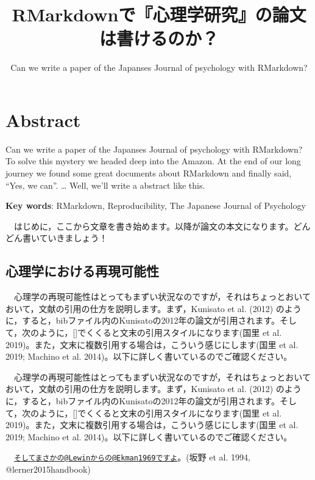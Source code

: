 \documentclass[11pt,a4paper,xelatex,ja=standard]{bxjsarticle}
\title{RMarkdownで『心理学研究』の論文は書けるのか？}
\subtitle{Can we write a paper of the Japanses Journal of psychology
with RMarkdown?}
\author{}
\date{}
\begin{document}
\pagestyle{empty}
\maketitle
\pagestyle{plain}
\setcounter{page}{1}

\hypertarget{abstract}{%
\section{Abstract}\label{abstract}}

Can we write a paper of the Japanses Journal of psychology with
RMarkdown? To solve this mystery we headed deep into the Amazon. At the
end of our long journey we found some great documents about RMarkdown
and finally said, ``Yes, we can''. \ldots{} Well, we'll write a abstract
like this.

\textbf{Key words}: RMarkdown, Reproducibility, The Japanese Journal of
Psychology

\clearpage

　はじめに，ここから文章を書き始めます。以降が論文の本文になります。どんどん書いていきましょう！

\hypertarget{ux5fc3ux7406ux5b66ux306bux304aux3051ux308bux518dux73feux53efux80fdux6027}{%
\subsection{心理学における再現可能性}\label{ux5fc3ux7406ux5b66ux306bux304aux3051ux308bux518dux73feux53efux80fdux6027}}

　心理学の再現可能性はとってもまずい状況なのですが，それはちょっとおいておいて，文献の引用の仕方を説明します。まず，Kunisato
et al. (2012)
のように，すると，bibファイル内のKunisatoの2012年の論文が引用されます。そして，次のように，{[}{]}でくくると文末の引用スタイルになります(国里
et al. 2019)。また，文末に複数引用する場合は，こういう感じにします(国里
et al. 2019; Machino et al.
2014)。以下に詳しく書いているのでご確認ください。

　心理学の再現可能性はとってもまずい状況なのですが，それはちょっとおいておいて，文献の引用の仕方を説明します。まず，Kunisato
et al. (2012)
のように，すると，bibファイル内のKunisatoの2012年の論文が引用されます。そして，次のように，{[}{]}でくくると文末の引用スタイルになります(国里
et al. 2019)。また，文末に複数引用する場合は，こういう感じにします(国里
et al. 2019; Machino et al.
2014)。以下に詳しく書いているのでご確認ください。 　

　\href{mailto:そしてまさかの@Lewinからの@Ekman1969ですよ}{\nolinkurl{そしてまさかの@Lewinからの@Ekman1969ですよ}}。(坂野
et al. 1994, @lerner2015handbook) 　
\end{document}

